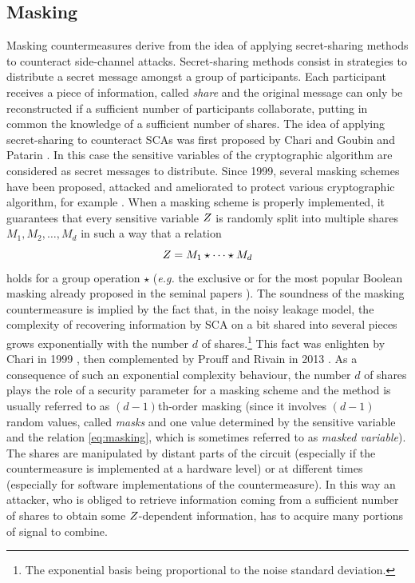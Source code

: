 \subsection{Masking}\label{sec:masking}
Masking countermeasures derive from the idea of applying secret-sharing methods to counteract side-channel attacks. Secret-sharing methods consist in strategies to distribute a secret message amongst a group of participants. Each participant receives a piece of information, called \emph{share} and the original message can only be reconstructed if a sufficient number of participants collaborate, putting in common the knowledge of a sufficient number of shares. The idea of applying secret-sharing to counteract SCAs was first proposed by Chari \etal \cite{chari1999towards} and Goubin and Patarin \cite{goubin1999and}. In this case the sensitive variables of the cryptographic algorithm are considered as secret messages to distribute. Since 1999, several masking schemes have been proposed, attacked and ameliorated to protect various cryptographic algorithm, for example \cite{messerges2000securing,akkar2001implementation,ishai2003private,blomer2004provably,oswald2005side,schramm2006higher,rivain2010provably,moradi2011pushing,coron2013higher,bilgin2014more,de2015higher,goudarzi2017fast,journault2017very}. When a masking scheme is properly implemented, it guarantees that every sensitive variable $Z$ is randomly split  into multiple shares $M_1,M_2,\dots,M_d$ in such a way that a relation 
\begin{equation}\label{eq:masking}
Z = M_1 \star \dots \star M_d
\end{equation}  holds for a group operation $\star$ (\emph{e.g.} the exclusive or for the most popular Boolean masking already proposed in the seminal papers \cite{chari1999towards,goubin1999and}). The soundness of the masking countermeasure is implied by the fact that, in the noisy leakage model, the complexity of recovering information by SCA on a bit shared into several pieces grows exponentially with the number $d$ of shares.\footnote{The exponential basis being proportional to the noise standard deviation.} This fact was enlighten by Chari \etal in 1999  \cite{chari1999towards}, then complemented by Prouff and Rivain in 2013 \cite{prouff2013masking}. As a consequence of such an exponential complexity behaviour, the number $d$ of shares plays the role of a security parameter for a masking scheme and the method is usually referred to as $(d-1)$th-order masking (since it involves $(d-1)$ random values, called \emph{masks} and one value determined by the sensitive variable and the relation \eqref{eq:masking}, which is sometimes referred to as \emph{masked variable}). The shares are manipulated by distant parts of the circuit (especially if the countermeasure is implemented at a hardware level) or at different times (especially for software implementations of the countermeasure). In this way an attacker, who is obliged to retrieve information coming from a sufficient number of shares to obtain some $Z$-dependent information, has to acquire many portions of signal to combine. \\

